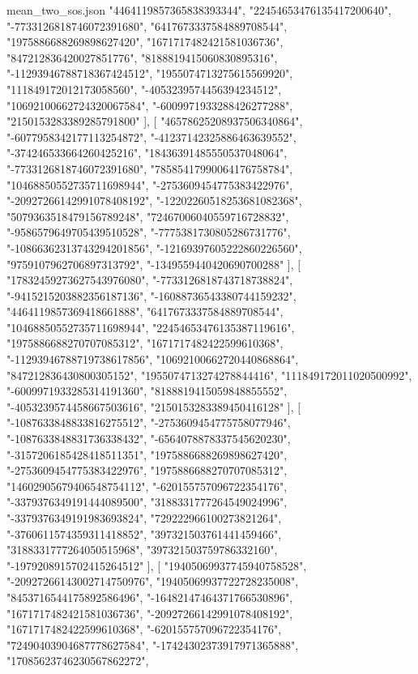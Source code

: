 \begin{filecontents*}[overwrite]{mean_two_sos.json}
    "4464119857365838393344",
    "22454653476135417200640",
    "-7733126818746072391680",
    "6417673337584889708544",
    "1975886688269898627420",
    "1671717482421581036736",
    "847212836420027851776",
    "8188819415060830895316",
    "-11293946788718367424512",
    "1955074713275615569920",
    "111849172012173058560",
    "-4053239574456394234512",
    "10692100662724320067584",
    "-6009971933288426277288",
    "2150153283389285791800"
   ],
   [
    "46578625208937506340864",
    "-6077958342177113254872",
    "-41237142325886463639552",
    "-374246533664260425216",
    "18436391485550537048064",
    "-7733126818746072391680",
    "78585417990064176758784",
    "10468850552735711698944",
    "-2753609454775383422976",
    "-20927266142991078408192",
    "-12202260518253681082368",
    "5079363518479156789248",
    "72467006040559716728832",
    "-9586579649705439510528",
    "-7775381730805286731776",
    "-10866362313743294201856",
    "-12169397605222860226560",
    "9759107962706897313792",
    "-1349559440420690700288"
   ],
   [
    "17832459273627543976080",
    "-7733126818743718738824",
    "-9415215203882356187136",
    "-16088736543380744159232",
    "4464119857369418661888",
    "6417673337584889708544",
    "10468850552735711698944",
    "22454653476135387119616",
    "1975886688270707085312",
    "1671717482422599610368",
    "-11293946788719738617856",
    "10692100662720440868864",
    "847212836430800305152",
    "1955074713274278844416",
    "111849172011020500992",
    "-6009971933285314191360",
    "8188819415059848855552",
    "-4053239574458667503616",
    "2150153283389450416128"
   ],
   [
    "-1087633848833816275512",
    "-2753609454775758077946",
    "-1087633848831736338432",
    "-6564078878337545620230",
    "-3157206185428418511351",
    "1975886688269898627420",
    "-2753609454775383422976",
    "1975886688270707085312",
    "14602905679406548754112",
    "-620155757096722354176",
    "-3379376349191444089500",
    "3188331777264549024996",
    "-3379376349191983693824",
    "729222966100273821264",
    "-3760611574359311418852",
    "397321503761441459466",
    "3188331777264050515968",
    "397321503759786332160",
    "-1979208915702415264512"
   ],
   [
    "19405069937745940758528",
    "-20927266143002714750976",
    "19405069937722728235008",
    "8453716544175892586496",
    "-16482147464371766530896",
    "1671717482421581036736",
    "-20927266142991078408192",
    "1671717482422599610368",
    "-620155757096722354176",
    "72490403904687778627584",
    "-17424302373917971365888",
    "17085623746230567862272",

\end{filecontents*}
